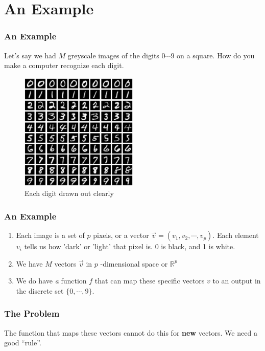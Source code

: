 \documentclass{beamer}
\begin{document}
\section{An Example}
\begin{frame}
  \frametitle{An Example}

  Let's say we had $M$ greyscale images of the digits $0 \cdots 9$ on a square. How do you make a computer recognize each digit.

\begin{figure}[ht]
  \centering
  \includegraphics[width=0.5\textwidth]{figures/dataset-card.png}
  \caption{Each digit drawn out clearly}
\end{figure}

\end{frame}
\begin{frame}
  \frametitle{An  Example}
  \begin{enumerate}
\item Each image is a set of \(p\) pixels, or a vector \(\vec{v} = (v_1, v_2, \cdots , v_p)\). Each element \(v_i\) tells us how 'dark' or 'light' that pixel is. 0 is black, and 1 is white.
          \pause
          \item We have \(M\) vectors \(\vec{v}\) in \(p\) -dimensional space or \(\mathbb{R}^{p}\)
          \pause
          \item  We do have \emph{a} function \(f\) that can map these specific vectors \(v\) to an output in the discrete set \(\{0, \cdots , 9\}\).
  \end{enumerate}
\end{frame}

\begin{frame}
 \frametitle{The Problem}
 The function that maps these vectors cannot do this for \textbf{new} vectors.
 \pause
\linebreak
 We need a good ``rule''.
\end{frame}
\end{document}
